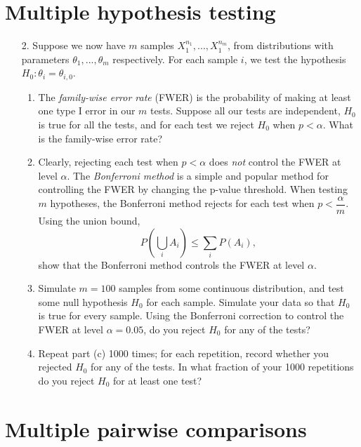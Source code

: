 \documentclass[11pt]{article}
\begin{document}
\section*{Multiple hypothesis testing}

\begin{enumerate}
\item[2.] Suppose we now have $m$ samples $X_1^{n_1}, ..., X_1^{n_m}$, from distributions with parameters $\theta_1,...,\theta_m$ respectively. For each sample $i$, we test the hypothesis $H_0: \theta_i = \theta_{i,0}$. 

\begin{enumerate}
\item The \textit{family-wise error rate} (FWER) is the probability of making at least one type I error in our $m$ tests. Suppose all our tests are independent, $H_0$ is true for all the tests, and for each test we reject $H_0$ when $p < \alpha$. What is the family-wise error rate?

\item Clearly, rejecting each test when $p < \alpha$ does \textit{not} control the FWER at level $\alpha$. The \textit{Bonferroni method} is a simple and popular method for controlling the FWER by changing the p-value threshold. When testing $m$ hypotheses, the Bonferroni method rejects for each test when $p < \dfrac{\alpha}{m}$.\\

Using the union bound,
$$P \left( \bigcup_i A_i \right) \leq \sum \limits_i P(A_i),$$
show that the Bonferroni method controls the FWER at level $\alpha$.

\item Simulate $m = 100$ samples from some continuous distribution, and test some null hypothesis $H_0$ for each sample. Simulate your data so that $H_0$ is true for every sample. Using the Bonferroni correction to control the FWER at level $\alpha = 0.05$, do you reject $H_0$ for any of the tests?

\item Repeat part (c) 1000 times; for each repetition, record whether you rejected $H_0$ for any of the tests. In what fraction of your 1000 repetitions do you reject $H_0$ for at least one test?
\end{enumerate}
\end{enumerate}

\section*{Multiple pairwise comparisons}
\end{document}
